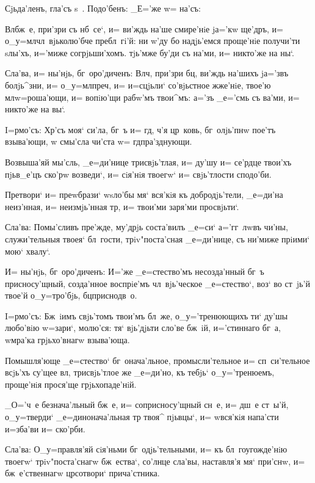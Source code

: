 Сjьда'ленъ, гла'съ s~. Подо'бенъ: _Е='же w= на'съ:

Вл бж~е, при'зри съ нб~се`, и= ви'ждь на'ше 
смире'нiе jа='кw ще'дръ, и= о_у=мл чл~вjьколю'бче 
пребл~гi'й: ни w'ду бо надjь'емся проще'нiе получи'ти 
sлы'хъ, и='миже согрjьши'хомъ. тjь'мже бу'ди съ на'ми, и= 
никто'же на ны`.

Сла'ва, и= ны'нjь, бг~оро'диченъ: Вл ч, 
при'зри бц, ви'ждь на'шихъ jа='звъ болjь^зни, и= 
о_у=мл преч, и= и=сцjьли` со'вjьстное 
жже'нiе, твое'ю мл w=роша'ющи, и= вопiю'щи рабw'мъ 
твои^мъ: а='зъ _е='смь съ ва'ми, и= никто'же на вы`.


I=рмо'съ: Хр'съ моя` си'ла, бг~ъ и= гд, 
ч'я цр~ковь, бг~олjь'пнw пое'тъ взыва'ющи, w\т 
смы'сла чи'ста w= гд пра'зднующи.

Возвыша'яй мы'сль, _е=ди'нице трисвjь'тлая, и= ду'шу 
и= се'рдце твои'хъ пjьв_е'цъ ско'рw возведи`, и= сiя'нiя 
твоегw` и= свjь'тлости сподо'би.

Претвори` и= преwбрази` w\т sло'бы мя` вся'кiя къ 
добродjь'тели, _е=ди'на неиз'нная, и= 
неизмjь'нная тр, и= твои'ми заря'ми просвjьти`.

Сла'ва: Помы'сливъ пре'жде, му'дрjь соста'вилъ _е=си` 
а='гг~лwвъ чи'ны, служи'тельныя твоея` бл~гости, 
трiv"поста'сная _е=ди'нице, съ ни'миже прiими` мою` 
хвалу`.

И= ны'нjь, бг~оро'диченъ: И='же _е=стество'мъ 
несозда'нный бг~ъ присносу'щный, созда'нное воспрiе'мъ 
чл~вjь'ческое _е=стество`, воз` во ст~jь'й твое'й 
о_у=тро'бjь, бц приснодв~о.


I=рмо'съ: Бж~iимъ свjь'томъ твои'мъ бл~же, 
о_у='тренюющихъ ти` ду'шы любо'вiю w=зари`, молю'ся: тя` 
вjь'дjьти сло'ве бж~iй, и='стиннаго бг~а, w\т мра'ка 
грjьхо'внагw взыва'юща.

Помышля'юще _е=стество` бг~онача'льное, 
промысли'тельное и= сп~си'тельное всjь'хъ су'щее вл, 
трисвjь'тлое же _е=ди'но, къ тебjь` о_у='тренюемъ, 
проще'нiя прося'ще грjьхопаде'нiй.

_О='ч~е безнача'льный бж~е, и= соприсносу'щный сн~е, 
и= дш~е ст~ы'й, о_у=тверди` _е=динонача'льная тр 
твоя^ пjьвцы`, и= w\т вся'кiя напа'сти и=зба'ви и= 
ско'рби.

Сла'ва: О_у=правля'яй сiя'ньми бг~одjь'тельными, и= къ 
бл~гоугожде'нiю твоегw` трiv"поста'снагw бж~ества`, 
со'лнце сла'вы, наставля'я мя` при'снw, и= бж~е'ственнагw 
цр сотвори` прича'стника.

